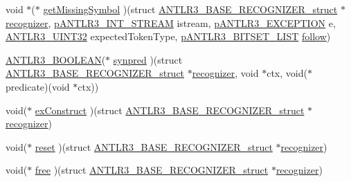 \begin{DoxyCompactItemize}
\item 
void $\ast$($\ast$ \hyperlink{struct_a_n_t_l_r3___b_a_s_e___r_e_c_o_g_n_i_z_e_r__struct_a18f404134e33bf360d9257d9be9588c8}{get\-Missing\-Symbol} )(struct \hyperlink{struct_a_n_t_l_r3___b_a_s_e___r_e_c_o_g_n_i_z_e_r__struct}{A\-N\-T\-L\-R3\-\_\-\-B\-A\-S\-E\-\_\-\-R\-E\-C\-O\-G\-N\-I\-Z\-E\-R\-\_\-struct} $\ast$\hyperlink{struct_a_n_t_l_r3___b_a_s_e___r_e_c_o_g_n_i_z_e_r__struct_aa7ab273aa44860cea6cd6e41528b57af}{recognizer}, \hyperlink{antlr3interfaces_8h_af34d949f6aa442e8e7770e420977d338}{p\-A\-N\-T\-L\-R3\-\_\-\-I\-N\-T\-\_\-\-S\-T\-R\-E\-A\-M} istream, \hyperlink{antlr3interfaces_8h_a71e034bba80bdc564fd0c8d62f2962b5}{p\-A\-N\-T\-L\-R3\-\_\-\-E\-X\-C\-E\-P\-T\-I\-O\-N} e, \hyperlink{antlr3defs_8h_ac41f744abd0fd25144b9eb9d11b1dfd1}{A\-N\-T\-L\-R3\-\_\-\-U\-I\-N\-T32} expected\-Token\-Type, \hyperlink{antlr3interfaces_8h_a59ad40804c151729987ddc3e78c2d95f}{p\-A\-N\-T\-L\-R3\-\_\-\-B\-I\-T\-S\-E\-T\-\_\-\-L\-I\-S\-T} \hyperlink{struct_a_n_t_l_r3___b_a_s_e___r_e_c_o_g_n_i_z_e_r__struct_a7bff9fe6af6e7c6ddccd99de75fb034b}{follow})
\item 
\hyperlink{antlr3defs_8h_a5b33dccbba3b7212539695e21df4079b}{A\-N\-T\-L\-R3\-\_\-\-B\-O\-O\-L\-E\-A\-N}($\ast$ \hyperlink{struct_a_n_t_l_r3___b_a_s_e___r_e_c_o_g_n_i_z_e_r__struct_a23043c23667935185fe939d5fa2f445b}{synpred} )(struct \hyperlink{struct_a_n_t_l_r3___b_a_s_e___r_e_c_o_g_n_i_z_e_r__struct}{A\-N\-T\-L\-R3\-\_\-\-B\-A\-S\-E\-\_\-\-R\-E\-C\-O\-G\-N\-I\-Z\-E\-R\-\_\-struct} $\ast$\hyperlink{struct_a_n_t_l_r3___b_a_s_e___r_e_c_o_g_n_i_z_e_r__struct_aa7ab273aa44860cea6cd6e41528b57af}{recognizer}, void $\ast$ctx, void($\ast$predicate)(void $\ast$ctx))
\item 
void($\ast$ \hyperlink{struct_a_n_t_l_r3___b_a_s_e___r_e_c_o_g_n_i_z_e_r__struct_aeb9618e34a17218f524e0b70158285e3}{ex\-Construct} )(struct \hyperlink{struct_a_n_t_l_r3___b_a_s_e___r_e_c_o_g_n_i_z_e_r__struct}{A\-N\-T\-L\-R3\-\_\-\-B\-A\-S\-E\-\_\-\-R\-E\-C\-O\-G\-N\-I\-Z\-E\-R\-\_\-struct} $\ast$\hyperlink{struct_a_n_t_l_r3___b_a_s_e___r_e_c_o_g_n_i_z_e_r__struct_aa7ab273aa44860cea6cd6e41528b57af}{recognizer})
\item 
void($\ast$ \hyperlink{struct_a_n_t_l_r3___b_a_s_e___r_e_c_o_g_n_i_z_e_r__struct_a428a26749476f09ec1fa2eb143e421e6}{reset} )(struct \hyperlink{struct_a_n_t_l_r3___b_a_s_e___r_e_c_o_g_n_i_z_e_r__struct}{A\-N\-T\-L\-R3\-\_\-\-B\-A\-S\-E\-\_\-\-R\-E\-C\-O\-G\-N\-I\-Z\-E\-R\-\_\-struct} $\ast$\hyperlink{struct_a_n_t_l_r3___b_a_s_e___r_e_c_o_g_n_i_z_e_r__struct_aa7ab273aa44860cea6cd6e41528b57af}{recognizer})
\item 
void($\ast$ \hyperlink{struct_a_n_t_l_r3___b_a_s_e___r_e_c_o_g_n_i_z_e_r__struct_a5bea95fd359401e60b2e904cb86da0ee}{free} )(struct \hyperlink{struct_a_n_t_l_r3___b_a_s_e___r_e_c_o_g_n_i_z_e_r__struct}{A\-N\-T\-L\-R3\-\_\-\-B\-A\-S\-E\-\_\-\-R\-E\-C\-O\-G\-N\-I\-Z\-E\-R\-\_\-struct} $\ast$\hyperlink{struct_a_n_t_l_r3___b_a_s_e___r_e_c_o_g_n_i_z_e_r__struct_aa7ab273aa44860cea6cd6e41528b57af}{recognizer})
\end{DoxyCompactItemize}


